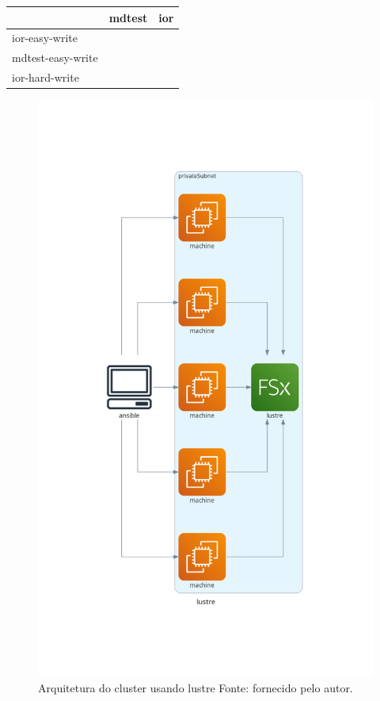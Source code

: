 \documentclass[article,a4paper,12pt,brazil,sumario=tradicional]{abntex2}
\begin{document}
\begin{table}[htb]
	\begin{tabular}{|l|l|l|}
		\hline
		& mdtest & ior \\ \hline
		ior-easy-write    &        &     \\ \hline
		mdtest-easy-write &        &     \\ \hline
		ior-hard-write    &        &     \\ \hline
	\end{tabular}
\end{table}

\begin{figure}[htb]
	\centering
	\includegraphics[width=1\textwidth]{lustre.png}
	\caption{Arquitetura do cluster usando lustre Fonte: fornecido pelo autor.}
	\label{fig:lustre}
\end{figure}
\end{document}
